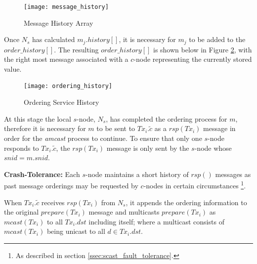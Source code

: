 \begin{enumerate}
    \begin{figure}[htbp!] 
        \centering    
         \texttt{[image: message\_history]}
         \caption[Message History Array]{Message History Array}
         \label{fig:message_history}
    \end{figure}            
        
        Once $N_s$ has calculated $m_j.history[]$, it is necessary for $m_j$ to be added to the $order\_history[]$.  The resulting $order\_history[]$ is shown below in Figure \ref{fig:ordering_history}, with the right most message associated with a $c$-node representing the currently stored value.  
		
        \begin{figure}[htbp!] 
        \centering    
         \texttt{[image: ordering\_history]}
         \caption[Ordering Service History]{Ordering Service History}
         \label{fig:ordering_history}
    \end{figure}            
        
		
        At this stage the local $s$-node, $N_s$, has completed the ordering process for $m$, therefore it is necessary for $m$ to be sent to $Tx_i.\tilde{c}$ as a $rsp(Tx_i)$ message in order for the \emph{amcast} process to continue.  To ensure that only one $s$-node responds to $Tx_i.\tilde{c}$, the $rsp(Tx_i)$ message is only sent by the $s$-node whose $snid = m.snid$.  
        
        \textbf{Crash-Tolerance:} Each $s$-node maintains a short history of $rsp()$ messages as past message orderings may be requested by $c$-nodes in certain circumstances \footnote{As described in section \ref{ssec:scast_fault_tolerance}.}.          
        
        \leftbar
        When $Tx_i.\tilde{c}$ receives $rsp(Tx_i)$ from $N_s$, it appends the ordering information to the original $prepare(Tx_i)$ message and multicasts $prepare(Tx_i)$ as $mcast(Tx_i)$ to all $Tx_i.dst$ including itself; where a multicast consists of $mcast(Tx_i)$ being unicast to all $d \in Tx_i.dst$. 
        

\end{enumerate}

